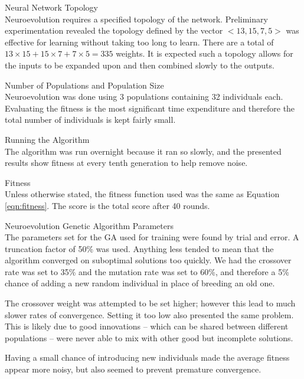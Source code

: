 \begin{description}
\item Neural Network Topology \hfill \\
Neuroevolution requires a specified topology of the network. Preliminary experimentation revealed the topology defined by the vector $<13, 15, 7, 5>$ was effective for learning without taking too long to learn. There are a total of $13 \times 15 + 15 \times 7 + 7 \times 5 = 335$ weights. It is expected such a topology allows for the inputs to be expanded upon and then combined slowly to the outputs.

\item Number of Populations and Population Size \hfill \\
Neuroevolution was done using 3 populations containing 32 individuals each. Evaluating the fitness is the most significant time expenditure and therefore the total number of individuals is kept fairly small. 

\item Running the Algorithm \hfill \\
The algorithm was run overnight because it ran so slowly, and the presented results show fitness at every tenth generation to help remove noise.

\item Fitness \hfill \\
Unless otherwise stated, the fitness function used was the same as Equation \ref{eqn:fitness}. The score is the total score after 40 rounds. 


\item Neuroevolution Genetic Algorithm Parameters \hfill \\
The parameters set for the GA used for training were found by trial and error. A truncation factor of 50\% was used. Anything less tended to mean that the algorithm converged on suboptimal solutions too quickly. We had the crossover rate was set to 35\% and the mutation rate was set to 60\%, and therefore a 5\% chance of adding a new random individual in place of breeding an old one.

The crossover weight was attempted to be set higher; however this lead to much slower rates of convergence. Setting it too low also presented the same problem. This is likely due to good innovations -- which can be shared between different populations -- were never able to mix with other good but incomplete solutions.

Having a small chance of introducing new individuals made the average fitness appear more noisy, but also seemed to prevent premature convergence.



\end{description}
